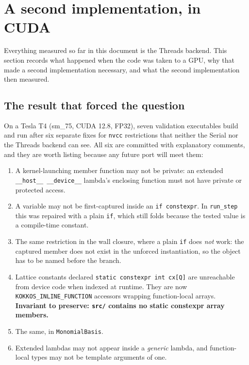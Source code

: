 \documentclass[11pt,a4paper]{article}
\newcommand{\code}[1]{\texttt{\small #1}}
\begin{document}
\section{A second implementation, in CUDA}
\label{sec:cuda}

Everything measured so far in this document is the Threads backend. This section
records what happened when the code was taken to a GPU, why that made a second
implementation necessary, and what the second implementation then measured.

\subsection{The result that forced the question}
\label{sec:cmcollapse}

On a Tesla T4 (sm\_75, CUDA 12.8, FP32), seven validation executables build and
run after six separate fixes for \code{nvcc} restrictions that neither the Serial
nor the Threads backend can see. All six are committed with explanatory comments,
and they are worth listing because any future port will meet them:

\begin{enumerate}[leftmargin=1.4em,itemsep=2pt]
\item A kernel-launching member function may not be private: an extended
  \code{\_\_host\_\_ \_\_device\_\_} lambda's enclosing function must not have
  private or protected access.
\item A variable may not be first-captured inside an \code{if constexpr}. In
  \code{run\_step} this was repaired with a plain \code{if}, which still folds
  because the tested value is a compile-time constant.
\item The same restriction in the wall closure, where a plain \code{if} does
  \emph{not} work: the captured member does not exist in the unforced
  instantiation, so the object has to be named before the branch.
\item Lattice constants declared \code{static constexpr int cx[Q]} are
  unreachable from device code when indexed at runtime. They are now
  \code{KOKKOS\_INLINE\_FUNCTION} accessors wrapping function-local arrays.
  \textbf{Invariant to preserve: \code{src/} contains no static constexpr array
  members.}
\item The same, in \code{MonomialBasis}.
\item Extended lambdas may not appear inside a \emph{generic} lambda, and
  function-local types may not be template arguments of one.
\end{enumerate}
\end{document}
